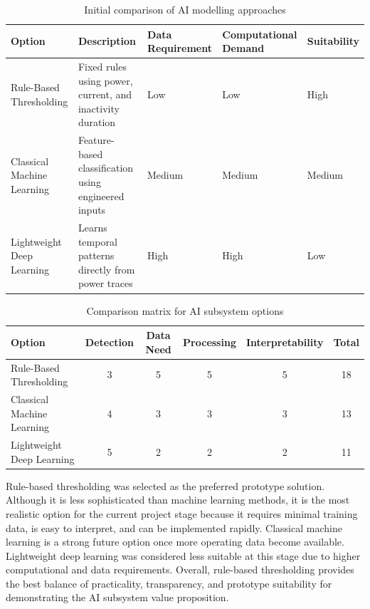 \documentclass[11pt, twoside, a4paper]{article}
\begin{document}
\begin{table}[H]
\centering
\renewcommand{\arraystretch}{1.15}
\begin{tabular}{|p{2cm}|p{4cm}|p{2cm}|p{3cm}|p{2cm}|}
\hline
\textbf{Option} & \textbf{Description} & \textbf{Data Requirement} & \textbf{Computational Demand} & \textbf{Suitability} \\ \hline
Rule-Based Thresholding & Fixed rules using power, current, and inactivity duration \cite{Systemdesignhandbook} & Low & Low & High \\ \hline
Classical Machine Learning & Feature-based classification using engineered inputs \cite{ibmanomalydetection} & Medium & Medium & Medium \\ \hline
Lightweight Deep Learning & Learns temporal patterns directly from power traces \cite{tensorflowlite} & High & High & Low \\ \hline
\end{tabular}
\caption{Initial comparison of AI modelling approaches}
\label{tab:ai_options}
\end{table}

\begin{table}[H]
\centering
\renewcommand{\arraystretch}{1.15}
\begin{tabular}{|p{3cm}|c|c|c|c|c|}
\hline
\textbf{Option} & \textbf{Detection} & \textbf{Data Need} & \textbf{Processing} & \textbf{Interpretability} & \textbf{Total} \\ \hline
Rule-Based Thresholding & 3 & 5 & 5 & 5 & 18 \\ \hline
Classical Machine Learning & 4 & 3 & 3 & 3 & 13 \\ \hline
Lightweight Deep Learning & 5 & 2 & 2 & 2 & 11 \\ \hline
\end{tabular}
\caption{Comparison matrix for AI subsystem options}
\label{tab:ai_trade}
\end{table}

Rule-based thresholding was selected as the preferred prototype solution. Although it is less sophisticated than machine learning methods, it is the most 
realistic option for the current project stage because it requires minimal training data, is easy to interpret, and can be implemented rapidly. Classical 
machine learning is a strong future option once more operating data become available. Lightweight deep learning was considered less suitable at this stage 
due to higher computational and data requirements. Overall, rule-based thresholding provides the best balance of practicality, transparency, and prototype 
suitability for demonstrating the AI subsystem value proposition.



\printbibliography
\end{document}
